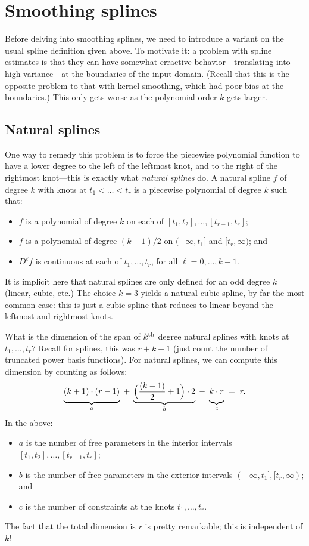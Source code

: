 \documentclass{article}
\begin{document}
\section{Smoothing splines}

Before delving into smoothing splines, we need to introduce a variant on the
usual spline definition given above. To motivate it: a problem with spline
estimates is that they can have somewhat erractive behavior---translating into
high variance---at the boundaries of the input domain. (Recall that this is the
opposite problem to that with kernel smoothing, which had poor bias at the
boundaries.) This only gets worse as the polynomial order $k$ gets larger.   

\subsection{Natural splines}

One way to remedy this problem is to force the piecewise polynomial function to
have a lower degree to the left of the leftmost knot, and to the right of the
rightmost knot---this is exactly what \emph{natural splines} do. A natural
spline $f$ of degree $k$ with knots at $t_1 < \dots < t_r$ is a piecewise
polynomial of degree $k$ such that:
\begin{itemize}
\item $f$ is a polynomial of degree $k$ on each of $[t_1,t_2], \dots,
  [t_{r-1},t_r]$; 
\item $f$ is a polynomial of degree $(k-1)/2$ on $(-\infty,t_1]$ and
  $[t_r,\infty)$; and 
\item $D^\ell f$ is continuous at each of $t_1,\dots,t_r$, for all
  $\ell=0,\dots,k-1$. 
\end{itemize}
It is implicit here that natural splines are only defined for an odd degree $k$
(linear, cubic, etc.) The choice $k=3$ yields a natural cubic spline, by far the
most common case: this is just a cubic spline that reduces to linear beyond the 
leftmost and rightmost knots.     

What is the dimension of the span of $k^{\text{th}}$ degree natural splines with knots at
$t_1,\dots,t_r$? Recall for splines, this was $r+k+1$ (just count the number of
truncated power basis functions). For natural splines, we can compute this
dimension by counting as follows:  
\[
\underbrace{\vphantom{\Big(\Big)} (k+1)\cdot(r-1)}_{a} \;+\; 
\underbrace{\Big(\frac{(k-1)}{2}+1\Big) \cdot 2}_{b} \;-\;
\underbrace{\vphantom{\Big(\Big)} k \cdot r}_{c} \;=\; r. 
\]
In the above: 
\begin{itemize}
\item $a$ is the number of free parameters in the interior intervals $[t_1,t_2], 
  \dots, [t_{r-1},t_r]$;
\item $b$ is the number of free parameters in the exterior intervals $(-\infty,t_1],
  [t_r,\infty)$; and 
\item $c$ is the number of constraints at the knots $t_1,\dots,t_r$.  
\end{itemize}
The fact that the total dimension is $r$ is pretty remarkable; this is
independent of $k$!   
\end{document}
